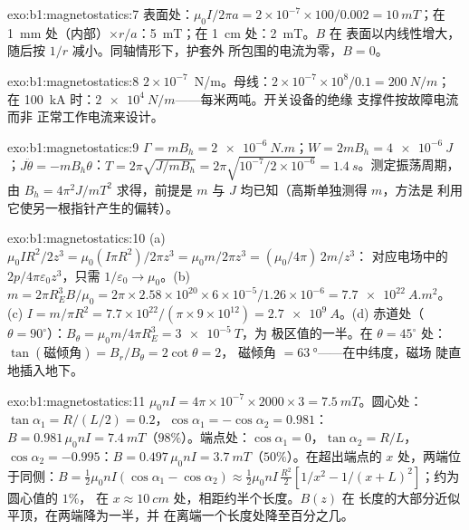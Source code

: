\begin{solution}{exo:b1:magnetostatics:7}
表面处：$\mu_0I/2\pi a = 2 \times 10^{-7} \times 100/0.002 = \qty{10}{mT}$；在
\qty{1}{mm} 处（内部）$\times r/a$：\qty{5}{mT}；在 \qty{1}{cm} 处：\qty{2}{mT}。$B$ 在
表面以内线性增大，随后按 $1/r$ 减小。同轴情形下，护套外
所包围的电流为零，$B = 0$。
\end{solution}

\begin{solution}{exo:b1:magnetostatics:8}
$2 \times 10^{-7}$~N/m。母线：$2 \times 10^{-7} \times 10^8/0.1 = \qty{200}{N/m}$；
在 \qty{100}{kA} 时：$\qty{2e4}{N/m}$——每米两吨。开关设备的绝缘
支撑件按故障电流而非
正常工作电流来设计。
\end{solution}

\begin{solution}{exo:b1:magnetostatics:9}
$\Gamma = mB_h = \qty{2e-6}{N.m}$；$W = 2mB_h = \qty{4e-6}{J}$；$J\ddot\theta =
-mB_h\theta$：$T = 2\pi\sqrt{J/mB_h} = 2\pi\sqrt{10^{-7}/2 \times 10^{-6}} =
\qty{1.4}{s}$。测定振荡周期，由 $B_h = 4\pi^2J/mT^2$ 求得，前提是 $m$ 与 $J$
均已知（高斯单独测得 $m$，方法是
利用它使另一根指针产生的偏转）。
\end{solution}

\begin{solution}{exo:b1:magnetostatics:10}
(a) $\mu_0IR^2/2z^3 = \mu_0(I\pi R^2)/2\pi z^3 = \mu_0m/2\pi z^3 = (\mu_0/4\pi)\,2m/z^3$：
对应电场中的 $2p/4\pi\varepsilon_0z^3$，只需 $1/\varepsilon_0 \to \mu_0$。(b) $m = 2\pi R_E^3B/
\mu_0 = 2\pi \times 2.58 \times 10^{20} \times 6 \times 10^{-5}/1.26 \times 10^{-6} = \qty{7.7e22}{A.m^2}$。
(c) $I = m/\pi R^2 = 7.7 \times 10^{22}/(\pi \times 9 \times 10^{12}) = \qty{2.7e9}{A}$。(d)
赤道处（$\theta = 90^\circ$）：$B_\theta = \mu_0m/4\pi R_E^3 = \qty{3e-5}{T}$，为
极区值的一半。在 $\theta = 45^\circ$ 处：$\tan(\text{磁倾角}) = B_r/B_\theta = 2\cot\theta = 2$，
磁倾角 $= \qty{63}{\degree}$——在中纬度，磁场
陡直地插入地下。
\end{solution}

\begin{solution}{exo:b1:magnetostatics:11}
$\mu_0nI = 4\pi \times 10^{-7} \times 2000 \times 3 = \qty{7.5}{mT}$。圆心处：$\tan\alpha_1 =
R/(L/2) = 0.2$，$\cos\alpha_1 = -\cos\alpha_2 = 0.981$：$B = 0.981\,\mu_0nI =
\qty{7.4}{mT}$（$98\%$）。端点处：$\cos\alpha_1 = 0$，$\tan\alpha_2 = R/L$，$\cos\alpha_2 =
-0.995$：$B = 0.497\,\mu_0nI = \qty{3.7}{mT}$（$50\%$）。在超出端点的 $x$
处，两端位于同侧：$B = \tfrac12\mu_0nI(\cos\alpha_1 - \cos\alpha_2)
\approx \tfrac12\mu_0nI\,\tfrac{R^2}{2}[1/x^2 - 1/(x + L)^2]$；约为圆心值的 $1\%$，
在 $x \approx \qty{10}{cm}$ 处，相距约半个长度。$B(z)$ 在
长度的大部分近似平顶，在两端降为一半，并
在离端一个长度处降至百分之几。
\end{solution}

